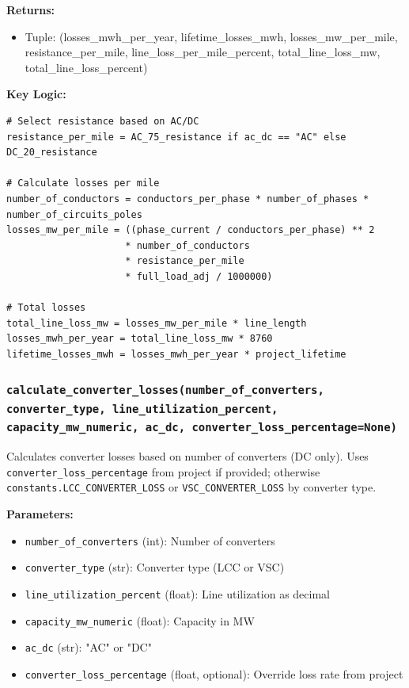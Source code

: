 \documentclass[ctcc_full_documentation.tex]{subfiles}
\begin{document}
\textbf{Returns:}
\begin{itemize}
    \item Tuple: (losses\_mwh\_per\_year, lifetime\_losses\_mwh, losses\_mw\_per\_mile, resistance\_per\_mile, line\_loss\_per\_mile\_percent, total\_line\_loss\_mw, total\_line\_loss\_percent)
\end{itemize}

\textbf{Key Logic:}
\begin{lstlisting}
# Select resistance based on AC/DC
resistance_per_mile = AC_75_resistance if ac_dc == "AC" else DC_20_resistance

# Calculate losses per mile
number_of_conductors = conductors_per_phase * number_of_phases * number_of_circuits_poles
losses_mw_per_mile = ((phase_current / conductors_per_phase) ** 2 
                     * number_of_conductors 
                     * resistance_per_mile 
                     * full_load_adj / 1000000)

# Total losses
total_line_loss_mw = losses_mw_per_mile * line_length
losses_mwh_per_year = total_line_loss_mw * 8760
lifetime_losses_mwh = losses_mwh_per_year * project_lifetime
\end{lstlisting}

\subsubsection{\texttt{calculate\_converter\_losses(number\_of\_converters, converter\_type, line\_utilization\_percent, capacity\_mw\_numeric, ac\_dc, converter\_loss\_percentage=None)}}

Calculates converter losses based on number of converters (DC only). Uses \texttt{converter\_loss\_percentage} from project if provided; otherwise \texttt{constants.LCC\_CONVERTER\_LOSS} or \texttt{VSC\_CONVERTER\_LOSS} by converter type.

\textbf{Parameters:}
\begin{itemize}
    \item \texttt{number\_of\_converters} (int): Number of converters
    \item \texttt{converter\_type} (str): Converter type (LCC or VSC)
    \item \texttt{line\_utilization\_percent} (float): Line utilization as decimal
    \item \texttt{capacity\_mw\_numeric} (float): Capacity in MW
    \item \texttt{ac\_dc} (str): "AC" or "DC"
    \item \texttt{converter\_loss\_percentage} (float, optional): Override loss rate from project
\end{itemize}
\end{document}
